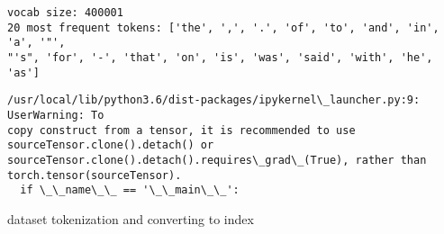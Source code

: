 \documentclass[10pt]{article}
\begin{document}
    \begin{Verbatim}[commandchars=\\\{\}]
vocab size: 400001
20 most frequent tokens: ['the', ',', '.', 'of', 'to', 'and', 'in', 'a', '"',
"'s", 'for', '-', 'that', 'on', 'is', 'was', 'said', 'with', 'he', 'as']
    \end{Verbatim}

    \begin{Verbatim}[commandchars=\\\{\}]
/usr/local/lib/python3.6/dist-packages/ipykernel\_launcher.py:9: UserWarning: To
copy construct from a tensor, it is recommended to use
sourceTensor.clone().detach() or
sourceTensor.clone().detach().requires\_grad\_(True), rather than
torch.tensor(sourceTensor).
  if \_\_name\_\_ == '\_\_main\_\_':
    \end{Verbatim}

    dataset tokenization and converting to index
\end{document}
